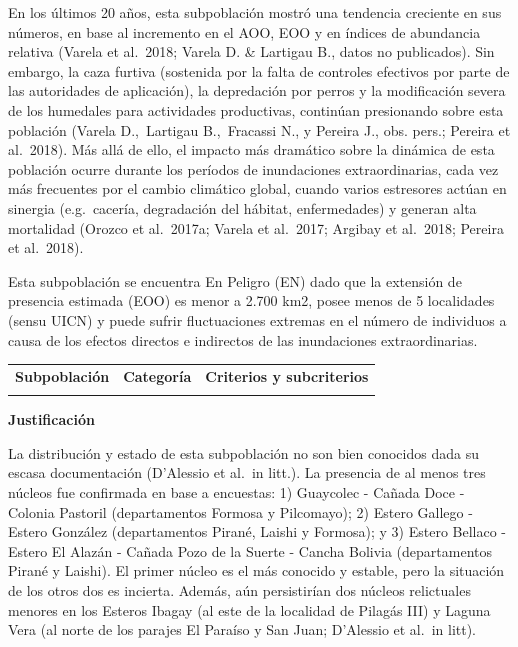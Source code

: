 \documentclass[
  x11names]{article}
\begin{document}
En los últimos 20 años, esta subpoblación mostró una tendencia creciente
en sus números, en base al incremento en el AOO, EOO y en índices de
abundancia relativa (Varela et al.~2018; Varela D. \& Lartigau B., datos
no publicados). Sin embargo, la caza furtiva (sostenida por la falta de
controles efectivos por parte de las autoridades de aplicación), la
depredación por perros y la modificación severa de los humedales para
actividades productivas, continúan presionando sobre esta población
(Varela D.,~Lartigau B.,~Fracassi N., y Pereira J., obs. pers.; Pereira
et al.~2018). Más allá de ello, el impacto más dramático sobre la
dinámica de esta población ocurre durante los períodos de inundaciones
extraordinarias, cada vez más frecuentes por el cambio climático global,
cuando varios estresores actúan en sinergia (e.g.~cacería, degradación
del hábitat, enfermedades) y generan alta mortalidad (Orozco et
al.~2017a; Varela et al.~2017; Argibay et al.~2018; Pereira et
al.~2018).

Esta subpoblación se encuentra En Peligro (EN) dado que la extensión de
presencia estimada (EOO) es menor a 2.700 km2, posee menos de 5
localidades (sensu UICN) y puede sufrir fluctuaciones extremas en el
número de individuos a causa de los efectos directos e indirectos de las
inundaciones extraordinarias.\vspace{0.5cm}

\begin{tabu} to 
\toprule
\textbf{Subpoblación} & \textbf{Categoría} & \textbf{Criterios y subcriterios}\\
\midrule
{} &  & \\
\bottomrule
\end{tabu}

\textbf{Justificación}

La distribución y estado de esta subpoblación no son bien conocidos dada
su escasa documentación (D'Alessio et al.~in litt.). La presencia de al
menos tres núcleos fue confirmada en base a encuestas: 1) Guaycolec -
Cañada Doce - Colonia Pastoril (departamentos Formosa y Pilcomayo); 2)
Estero Gallego - Estero González (departamentos Pirané, Laishi y
Formosa); y 3) Estero Bellaco - Estero El Alazán - Cañada Pozo de la
Suerte - Cancha Bolivia (departamentos Pirané y Laishi). El primer
núcleo es el más conocido y estable, pero la situación de los otros dos
es incierta. Además, aún persistirían dos núcleos relictuales menores en
los Esteros Ibagay (al este de la localidad de Pilagás III) y Laguna
Vera (al norte de los parajes El Paraíso y San Juan; D'Alessio et al.~in
litt).
\end{document}

